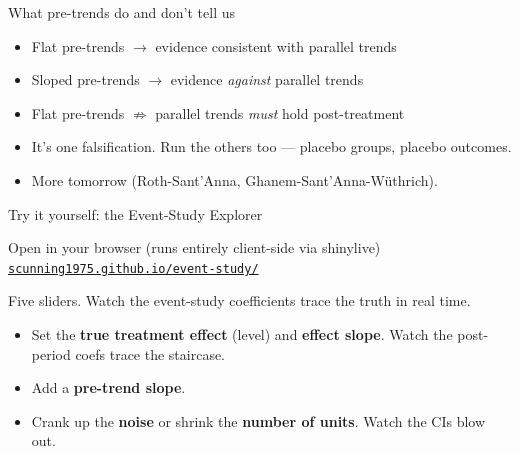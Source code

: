 \documentclass[aspectratio=169,11pt]{beamer}
\begin{document}
\begin{frame}{What pre-trends do and don't tell us}
\vspace{0.4em}
\begin{itemize}
  \item Flat pre-trends $\rightarrow$ evidence consistent with parallel trends
  \item Sloped pre-trends $\rightarrow$ evidence \textit{against} parallel trends
  \item Flat pre-trends $\nRightarrow$ parallel trends \textit{must} hold post-treatment
  \item It's one falsification. Run the others too --- placebo groups, placebo outcomes.
  \item {} More tomorrow (Roth-Sant'Anna, Ghanem-Sant'Anna-Wüthrich).
\end{itemize}
\end{frame}

\begin{frame}{Try it yourself: the Event-Study Explorer}
\vspace{0.3em}
\begin{block}{Open in your browser (runs entirely client-side via shinylive)}
\centering
\href{https://scunning1975.github.io/event-study/}{\color{ocean}\texttt{scunning1975.github.io/event-study/}}
\end{block}
\vspace{0.4em}
Five sliders. Watch the event-study coefficients trace the truth in real time.
\vspace{0.4em}
\begin{itemize}\small
  \item Set the \textbf{true treatment effect} (level) and \textbf{effect slope}. Watch the post-period coefs trace the staircase.
  \item Add a \textbf{pre-trend slope}. \;
  \item Crank up the \textbf{noise} or shrink the \textbf{number of units}. \;Watch the CIs blow out.
\end{itemize}
\vspace{0.4em}
\end{frame}
\end{document}
